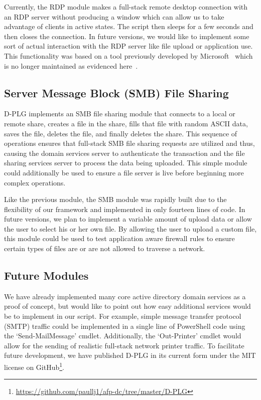 Currently, the RDP module makes a full-stack remote desktop connection with an
RDP server without producing a window which can allow us to take advantage of
clients in active states.  The script then sleeps for a few seconds and then
closes the connection.  In future versions, we would like to implement some
sort of actual interaction with the RDP server like file upload or application
use.  This functionality was based on a tool previously developed by
Microsoft~\cite{microsoft09} which is no longer maintained as evidenced
here~\cite{szeto12}.

\subsection{Server Message Block (SMB) File Sharing}
D-PLG implements an SMB file sharing module that connects to a local or remote
share, creates a file in the share, fills that file with random ASCII data,
saves the file, deletes the file, and finally deletes the share.  This sequence
of operations ensures that full-stack SMB file sharing requests are utilized
and thus, causing the domain services server to authenticate the transaction
and the file sharing services server to process the data being uploaded.  This
simple module could additionally be used to ensure a file server is live before
beginning more complex operations.

Like the previous module, the SMB module was rapidly built due to the
flexibility of our framework and implemented in only fourteen lines of code.
In future versions, we plan to implement a variable amount of upload data or
allow the user to select his or her own file.  By allowing the user to upload a
custom file, this module could be used to test application aware firewall rules
to ensure certain types of files are or are not allowed to traverse a network.

\subsection{Future Modules} 
We have already implemented many core active directory domain services as a
proof of concept, but would like to point out how easy additional services
would be to implement in our script.  For example, simple message transfer
protocol (SMTP) traffic could be implemented in a single line of PowerShell
code using the `Send-MailMessage' cmdlet.  Additionally, the `Out-Printer'
cmdlet would allow for the sending of realistic full-stack network printer
traffic.  To facilitate future development, we have published D-PLG in its
current form under the MIT license on
GitHub\footnote{\url{https://github.com/paullj1/afp-dc/tree/master/D-PLG}}.

